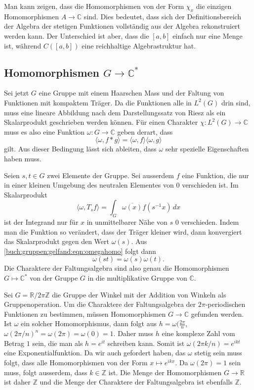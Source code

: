 Man kann zeigen, dass die Homomorphismen von der Form $\chi_x$ 
die einzigen Homomorphismen $A\to\mathbb{C}$ sind.
Dies bedeutet, dass sich der Definitionsbereich der Algebra der
stetigen Funktionen vollständig aus der Algebra rekonstruiert werden 
kann.
Der Unterschied ist aber, dass die $[a,b]$ einfach nur eine Menge ist,
während $C([a,b])$ eine reichhaltige Algebrastruktur hat.

%
%
\subsection{Homomorphismen $G\to \mathbb{C}^*$}
Sei jetzt $G$ eine Gruppe mit einem Haarschen Mass und der Faltung 
von Funktionen mit kompaktem Träger.
Da die Funktionen alle in $L^2(G)$ drin sind, muss eine lineare
Abbildung nach dem Darstellungssatz von Riesz als ein Skalarprodukt
geschrieben werden können.
Für einen Charakter $\chi\colon L^2(G)\to\mathbb{C}$ muss es also eine
Funktion $\omega\colon G\to\mathbb{C}$ geben derart, dass
\begin{equation}
\langle \omega, f*g\rangle
=
\langle \omega, f\rangle
\langle \omega, g\rangle
\label{buch:gruppen:gelfand:eqn:omegahomo}
\end{equation}
gilt.
Aus dieser Bedingung lässt sich ableiten, dass $\omega$ sehr spezielle
Eigenschaften haben muss.

Seien $s,t\in G$ zwei Elemente der Gruppe.
Sei ausserdem $f$ eine Funktion, die nur in einer kleinen Umgebung 
des neutralen Elementes von $0$ verschieden ist.
Im Skalarprodukt
\[
\langle \omega, T_{s}f\rangle
=
\int_{G} \overline{\omega(x)} f(s^{-1}x) \,dx
\]
ist der Integrand nur für $x$ in unmittelbarer Nähe von $s$ 
$0$ verschieden.
Indem man die Funktion so verändert, dass der Träger kleiner wird,
dann konvergiert das Skalarprodukt gegen den Wert $\omega(s)$.
Aus \eqref{buch:gruppen:gelfand:eqn:omegahomo} folgt dann
\[
\omega(st) = \omega(s)\omega(t).
\]
Die Charaktere der Faltungsalgebra sind also genau die Homomorphismen
$G\mapsto\mathbb{C}^*$ von der Gruppe $G$ in die multiplikative
Gruppe von $\mathbb{C}$.

\begin{beispiel}
Sei $G= \mathbb{R}/2\pi\mathbb{Z}$ die Gruppe der Winkel mit der 
Addition von Winkeln als Gruppenoperation.
Um die Charaktere der Faltungsalgebra der $2\pi$-periodischen Funktionen
zu bestimmen, müssen Homomorphismen $G\to\mathbb{C}$ gefunden werden.
Ist $\omega$ ein solcher Homomorphismus, dann folgt aus
$h=\omega(\frac{2\pi}{n}$, $\omega(2\pi/n)^n = \omega(2\pi)=\omega(0)=1$.
Daher muss $h$ eine komplexe Zahl vom Betrag $1$ sein, die man als
$h=e^{it}$ schreiben kann.
Somit ist $\omega(2\pi k/n) = e^{ikt}$ eine Exponentialfunktion.
Da wir auch gefordert haben, das $\omega$ stetig sein muss folgt,
dass alle Homomorphismen von der Form $x\mapsto e^{ikx}$.
Da $\omega(2\pi)=1$ sein muss, folgt ausserdem, dass $k\in \mathbb{Z}$
ist.
Die Menge der Homomorphismen $G\to\mathbb{R}$ ist daher $\mathbb{Z}$ und
die Menge der Charaktere der Faltungsalgebra ist ebenfalls $\mathbb{Z}$.
\end{beispiel}

